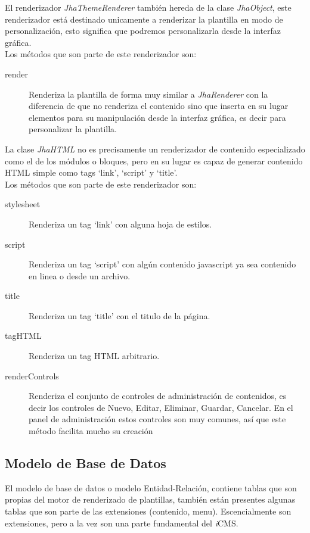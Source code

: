 El renderizador \textit{JhaThemeRenderer} tambi\'en hereda de la clase \textit{JhaObject}, este renderizador est\'a destinado unicamente a renderizar la plantilla en modo de personalizaci\'on, esto significa que podremos personalizarla desde la interfaz gr\'afica.\\
Los m\'etodos que son parte de este renderizador son:
\begin{description}
\item[render] Renderiza la plantilla de forma muy similar a \textit{JhaRenderer} con la diferencia de que no renderiza el contenido sino que inserta en su lugar elementos para su manipulaci\'on desde la interfaz gr\'afica, es decir para personalizar la plantilla.
\end{description}



La clase \textit{JhaHTML} no es precisamente un renderizador de contenido especializado como el de los m\'odulos o bloques, pero en su lugar es capaz de generar contenido HTML simple como tags `link', `script' y `title'.\\
Los m\'etodos que son parte de este renderizador son:
\begin{description}
\item[stylesheet] Renderiza un tag `link' con alguna hoja de estilos.
\item[script] Renderiza un tag `script' con alg\'un contenido javascript ya sea contenido en linea o desde un archivo.
\item[title] Renderiza un tag `title' con el titulo de la p\'agina.
\item[tagHTML] Renderiza un tag HTML arbitrario.
\item[renderControls] Renderiza el conjunto de controles de administraci\'on de contenidos, es decir los controles de Nuevo, Editar, Eliminar, Guardar, Cancelar. En el panel de administraci\'on estos controles son muy comunes, as\'i que este m\'etodo facilita mucho su creaci\'on
\end{description}



\subsection{Modelo de Base de Datos}
El modelo de base de datos o modelo Entidad-Relaci\'on, contiene tablas que son propias del motor de renderizado de plantillas, tambi\'en est\'an presentes algunas tablas que son parte de las extensiones (contenido, menu). Escencialmente son extensiones, pero a la vez son una parte fundamental del \textit{i}CMS.

